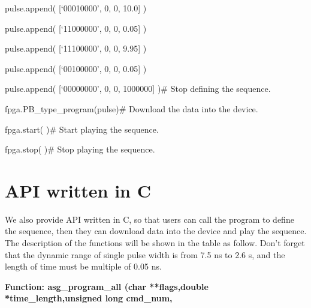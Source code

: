 pulse.append({ }[`00010000', { }0, { }0, { }10.0]{ })

pulse.append({ }[`11000000', { }0, { }0, { }0.05]{ })

pulse.append({ }[`11100000', { }0, { }0, { }9.95]{ })

pulse.append({ }[`00100000', { }0, { }0, { }0.05]{ })

pulse.append({ }[`00000000', { }0, { }0, { }1000000]{ })\qquad    \#  Stop defining the sequence.

fpga.PB\_type\_program(pulse)\qquad        \#  Download the data into the device.

fpga.start( )\qquad          \#  Start playing the sequence.

fpga.stop( )\qquad     \#  Stop playing the sequence.

\large


\vspace{0.2cm}
\section{\heiti API written in C}

\hspace{-0.2cm}We also provide API written in C, so that users can call the program to define the sequence, then they can download data into the device and play the sequence. The description of the functions will be shown in the table as follow. Don't forget that the dynamic range of single pulse width is from 7.5 ns to 2.6 s, and the length of time must be multiple of 0.05 ns.

\vspace{0.1cm}
\noindent\fontsize{12pt}{\baselineskip}\textbf{\heiti Function: asg\_program\_all (char **flags,double *time\_length,unsigned long cmd\_num,}

